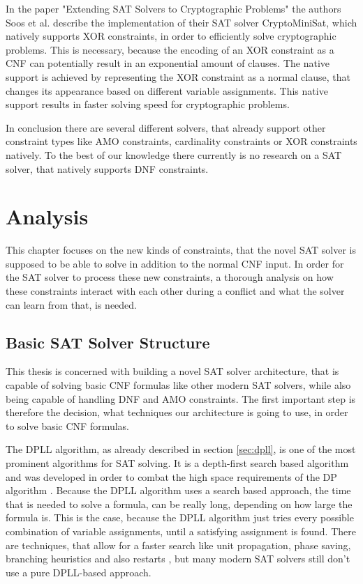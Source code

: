 In the paper "Extending SAT Solvers to Cryptographic Problems" \cite{DBLP:conf/sat/SoosNC09} the authors Soos et al. describe the implementation of their SAT solver CryptoMiniSat, which natively supports XOR constraints, in order to efficiently solve cryptographic problems. This is necessary, because the encoding of an XOR constraint as a CNF can potentially result in an exponential amount of clauses. The native support is achieved by representing the XOR constraint as a normal clause, that changes its appearance based on different variable assignments. This native support results in faster solving speed for cryptographic problems.

In conclusion there are several different solvers, that already support other constraint types like AMO constraints, cardinality constraints or XOR constraints natively. To the best of our knowledge there currently is no research on a SAT solver, that natively supports DNF constraints.

\chapter{Analysis}
\label{ch:Analysis}

This chapter focuses on the new kinds of constraints, that the novel SAT solver is supposed to be able to solve in addition to the normal CNF input. In order for the SAT solver to process these new constraints, a thorough analysis on how these constraints interact with each other during a conflict and what the solver can learn from that, is needed.

\section{Basic SAT Solver Structure}

This thesis is concerned with building a novel SAT solver architecture, that is capable of solving basic CNF formulas like other modern SAT solvers, while also being capable of handling DNF and AMO constraints. The first important step is therefore the decision, what techniques our architecture is going to use, in order to solve basic CNF formulas.

The DPLL algorithm, as already described in section \ref{sec:dpll}, is one of the most prominent algorithms for SAT solving. It is a depth-first search based algorithm and was developed in order to combat the high space requirements of the DP algorithm \cite{biere2009handbook}. Because the DPLL algorithm uses a search based approach, the time that is needed to solve a formula, can be really long, depending on how large the formula is. This is the case, because the DPLL algorithm just tries every possible combination of variable assignments, until a satisfying assignment is found. There are techniques, that allow for a faster search like unit propagation, phase saving, branching heuristics and also restarts \cite{biere2009handbook}, but many modern SAT solvers still don't use a pure DPLL-based approach.

